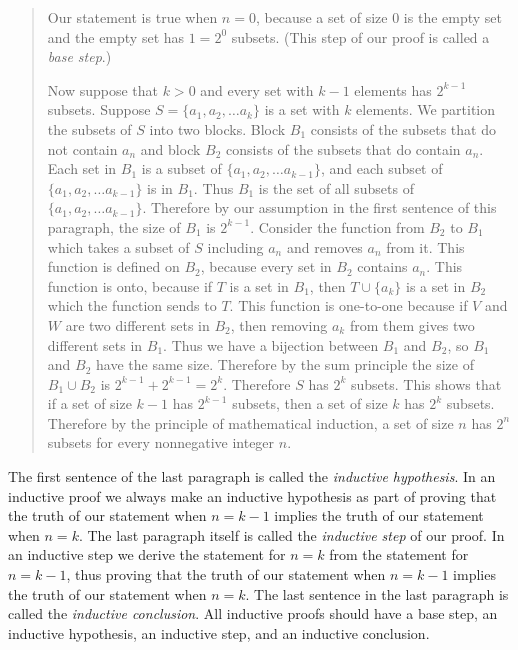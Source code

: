 \begin{quote}Our statement
is true when $n=0$, because a set of size 0 is the empty set and the
empty set has $1=2^0$ subsets. (This step of our proof is called a {\em
base step}.)

Now suppose that $k>0$ and every set with $k-1$ elements has $2^{k-1}$
subsets.  Suppose $S=\{a_1,a_2,\ldots a_k\}$ is a set with $k$ elements. 
We partition the subsets of $S$ into two blocks.  Block $B_1$ consists of
the subsets that do not contain $a_n$ and block $B_2$ consists of the
subsets that do contain $a_n$.  Each set in $B_1$ is a subset of
$\{a_1,a_2,\ldots a_{k-1}\}$, and each subset of $\{a_1,a_2, \ldots
a_{k-1}\}$ is in $B_1$.  Thus $B_1$ is the set of all subsets of
$\{a_1,a_2,\ldots a_{k-1}\}$.  Therefore by our assumption in the first
sentence of this paragraph, the size of $B_1$ is $2^{k-1}$.  Consider the
function from $B_2$ to $B_1$ which takes a subset of $S$ including $a_n$
and removes $a_n$ from it.  This function is defined on $B_2$, because
every set in $B_2$ contains $a_n$.  This function is onto, because if
$T$ is a set in $B_1$, then $T\cup \{a_k\}$ is a set in $B_2$ which the
function sends to $T$.  This function is one-to-one because if $V$ and
$W$ are two different sets in $B_2$, then removing $a_k$ from them gives
two different sets in $B_1$.  Thus we have a bijection between $B_1$ and
$B_2$, so $B_1$ and $B_2$ have the same size.  Therefore by the sum
principle the size of
$B_1\cup B_2$ is $2^{k-1} +2^{k-1}=2^k$.  Therefore $S$ has $2^k$
subsets.  This shows that if a set of size $k-1$ has $2^{k-1}$ subsets,
then a set of size $k$ has $2^k$ subsets.  Therefore by the principle of
mathematical induction, a set of size $n$ has $2^n$ subsets for every
nonnegative integer $n$.
\end{quote}

The first sentence of the last paragraph is called the {\em inductive
hypothesis}.  In an inductive proof we always make an inductive
hypothesis as part of proving that the truth of our statement when
$n=k-1$ implies the truth of our statement when $n=k$.  The last
paragraph itself is called the {\em inductive step} of our proof.  In an
inductive step we derive the statement for $n=k$ from the statement for
$n=k-1$, thus proving that the truth of our statement when $n=k-1$
implies the truth of our statement when $n=k$.  The last sentence in the
last paragraph is called the {\em inductive conclusion}.  All inductive
proofs should have a base step, an inductive hypothesis, an inductive
step, and an inductive conclusion.  

